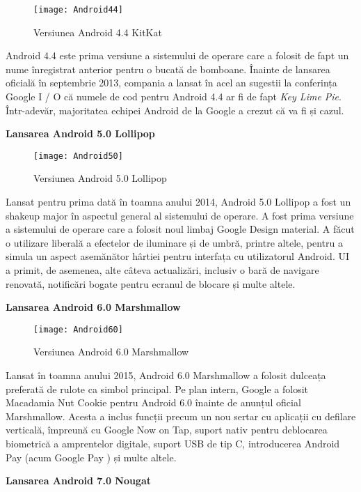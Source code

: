 \documentclass[a4paper]{article}
\begin{document}
\begin{figure}[h]
	\centering
	\texttt{[image: Android44]} \\
	\caption{Versiunea Android 4.4 KitKat}
	\label{fig:Android44}
\end{figure}
\par
Android 4.4 este prima versiune a sistemului de operare care a folosit de fapt un nume înregistrat anterior pentru o bucată de bomboane. Înainte de lansarea oficială în septembrie 2013, compania a lansat în acel an sugestii la conferința Google I / O că numele de cod pentru Android 4.4 ar fi de fapt \textit{Key Lime Pie}. Într-adevăr, majoritatea echipei Android de la Google a crezut că va fi și cazul.
\clearpage
\begin{center}
	\large\textbf{Lansarea Android 5.0 Lollipop}
\end{center}

\begin{figure}[h]
	\centering
	\texttt{[image: Android50]} \\
	\caption{Versiunea Android 5.0 Lollipop}
	\label{fig:Android50}
\end{figure}
\par
Lansat pentru prima dată în toamna anului 2014, Android 5.0 Lollipop a fost un shakeup major în aspectul general al sistemului de operare. A fost prima versiune a sistemului de operare care a folosit noul limbaj Google Design material. A făcut o utilizare liberală a efectelor de iluminare și de umbră, printre altele, pentru a simula un aspect asemănător hârtiei pentru interfața cu utilizatorul Android. UI a primit, de asemenea, alte câteva actualizări, inclusiv o bară de navigare renovată, notificări bogate pentru ecranul de blocare și multe altele.
\begin{center}
	\large\textbf{Lansarea Android 6.0 Marshmallow}
\end{center}

\begin{figure}[h]
	\centering
	\texttt{[image: Android60]} \\
	\caption{Versiunea Android 6.0 Marshmallow}
	\label{fig:Android60}
\end{figure}
\par
Lansat în toamna anului 2015, Android 6.0 Marshmallow a folosit dulceața preferată de rulote ca simbol principal. Pe plan intern, Google a folosit Macadamia Nut Cookie pentru Android 6.0 înainte de anunțul oficial Marshmallow. Acesta a inclus funcții precum un nou sertar cu aplicații cu defilare verticală, împreună cu Google Now on Tap, suport nativ pentru deblocarea biometrică a amprentelor digitale, suport USB de tip C, introducerea Android Pay (acum Google Pay ) și multe altele.
\clearpage
\begin{center}
	\large\textbf{Lansarea Android 7.0 Nougat}
\end{center}
\end{document}
